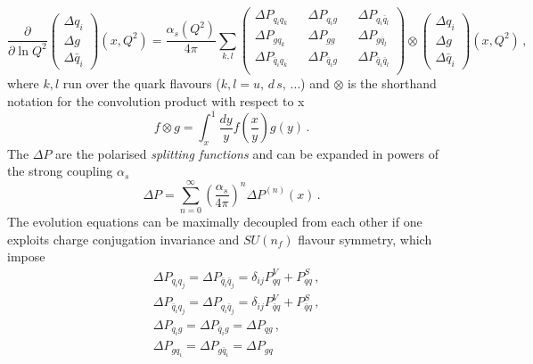 \begin{equation}
  \frac{\partial}{\partial \ln Q^2} 
  \left(\begin{matrix}
    \Delta q_i \\
    \Delta g \\
    \Delta \bar{q}_i
  \end{matrix} \right) (x,Q^2) = \frac{\alpha_{s}(Q^2)}{4 \pi}  \sum_{k,l}
  \left(\begin{matrix}
    \Delta P_{q_i q_k} && \Delta P_{q_i g} && \Delta P_{q_i \bar{q}_l} \\
    \Delta P_{g q_k} && \Delta P_{g g} && \Delta P_{g \bar{q}_l} \\
    \Delta P_{\bar{q}_i q_k} && \Delta P_{\bar{q}_i g} && \Delta P_{\bar{q}_i \bar{q}_l} \\
  \end{matrix}\right) \otimes 
  \left(\begin{matrix}
    \Delta q_i \\
    \Delta g \\
    \Delta \bar{q}_i
  \end{matrix} \right) (x,Q^2) \,,
  \label{eq:DGLAP_coupled}
\end{equation}
where $k,l$ run over the quark flavours ($k,l = u,\, d\, s,\, \dots$) and $\otimes$ is the shorthand notation for the convolution product with respect to x
\begin{equation}
  f \otimes g = \int_{x}^{1} \frac{dy}{y} f \left(\frac{x}{y} \right) g(y) \,.
  \label{eq:def_conv}
\end{equation}
The $\Delta P$ are the polarised \textit{splitting functions} and can be expanded in powers of the strong coupling $\alpha_s$
\begin{equation}
  \Delta P = \sum_{n=0}^{\infty} \left( \frac{\alpha_s}{4\pi} \right)^{n} \Delta P^{(n)}(x)\,.
\end{equation}
The evolution equations can be maximally decoupled from each other if one exploits charge conjugation invariance and $SU(n_f)$ flavour symmetry, which impose 
\begin{equation}
  \begin{split}
    & \Delta P_{q_i q_j} = \Delta P_{\bar{q}_i \bar{q}_j} = \delta_{ij} P_{qq}^{V} + P_{qq}^{S} \,,\\
    & \Delta P_{\bar{q}_i q_j} = \Delta P_{q_i \bar{q}_j} = \delta_{ij} P_{\bar{q}q}^{V} + P_{\bar{q}q}^{S} \,,\\
    & \Delta P_{q_i g} = \Delta P_{\bar{q}_i g} = \Delta P_{qg} \,, \\
    & \Delta P_{g q_i} = \Delta P_{g \bar{q}_i} = \Delta P_{gq}
  \end{split}
\end{equation}
